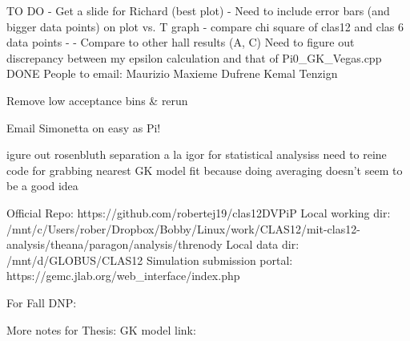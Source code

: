 TO DO
-	Get a slide for Richard (best plot)
-	Need to include error bars (and bigger data points) on plot vs. T graph
-	compare chi square of clas12 and clas 6 data points
-	 
-	
Compare to other hall results (A, C)
Need to figure out discrepancy between my epsilon calculation and that of Pi0_GK_Vegas.cpp
DONE
People to email:
Maurizio
Maxieme Dufrene
Kemal Tenzign

Remove low acceptance bins & rerun

Email Simonetta on easy as Pi!

igure out rosenbluth separation a la igor for statistical analysiss
need to reine code for grabbing nearest GK model fit because doing averaging doesn't seem to be a good idea




Official Repo: https://github.com/robertej19/clas12DVPiP
Local working dir: /mnt/c/Users/rober/Dropbox/Bobby/Linux/work/CLAS12/mit-clas12-analysis/theana/paragon/analysis/threnody
Local data dir: /mnt/d/GLOBUS/CLAS12
Simulation submission portal: https://gemc.jlab.org/web_interface/index.php

For Fall DNP:

More notes for Thesis:
GK model link: 

 






